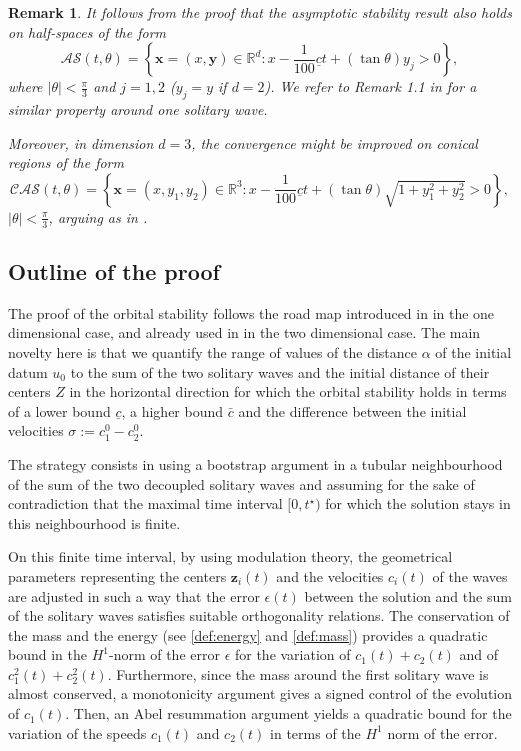 \documentclass[reqno,10pt]{amsart}
\newtheorem{rema}[lemm]{Remark}
\numberwithin{equation}{section}
\newcommand{\bx}{\mathbf{x}}
\newcommand{\by}{\mathbf{y}}
\newcommand{\bz}{\mathbf{z}}
\begin{document}
 \begin{rema}
It follows from the proof that the asymptotic stability result also holds on half-spaces of the form 
\begin{equation*}
\mathcal{AS}(t,\theta)=\left\{ \bx=(x,\by) \in \mathbb R^d : x-\frac1{100}\underline{c}t+(\tan{\theta})y_j>0 \right\},
\end{equation*}
where $|\theta|<\frac{\pi}3$ and $j=1,2$ ($y_j=y$ if $d=2$). We refer to Remark 1.1 in \cite{CMPS16} for a similar property around one solitary wave.

Moreover, in dimension $d=3$, the convergence might be improved on conical regions of the form 
\begin{equation*}
\mathcal{CAS}(t,\theta)=\left\{ \bx=(x,y_1,y_2) \in \mathbb R^3 : x-\frac1{100}\underline{c}t+(\tan{\theta})\sqrt{1+y_1^2+y_2^2}>0 \right\},
\end{equation*}
$|\theta|<\frac{\pi}3$, arguing as in \cite{FHRY23}.
 \end{rema}
	
	
	
		
\subsection{Outline of the proof}


The proof of the orbital stability follows the road map introduced in \cite{MMT02} in the one dimensional case, and already used in \cite{CMPS16} in the two dimensional case. The main novelty here is that we quantify the range of values of the distance $\alpha$ of the initial datum $u_0$ to the sum of the two solitary waves and the initial distance of their centers $Z$ in the horizontal direction for which the orbital stability holds in terms of a lower bound $\underline{c}$, a higher bound $\bar{c}$ and the difference between the initial velocities $\sigma:=c_1^0-c_2^0$.

The strategy consists in using a bootstrap argument in a tubular neighbourhood of the sum of the two decoupled solitary waves and assuming for the sake of contradiction that the maximal time interval $[0,t^{\star})$ for which the solution stays in this neighbourhood is finite. 

On this finite time interval, by using modulation theory, the geometrical parameters representing the centers $\bz_i(t)$ and the velocities $c_i(t)$ of the waves are adjusted in such a way that the error $\epsilon(t)$ between the solution and the sum of the solitary waves satisfies suitable orthogonality relations. The conservation of the mass and the energy (see \eqref{def:energy} and \eqref{def:mass}) provides a quadratic bound in the $H^1$-norm of the error $\epsilon$ for the variation of $c_1(t) + c_2(t)$ and of $c_1^2(t)+c_2^2(t)$. Furthermore, since the mass around the first solitary wave is almost conserved, a monotonicity argument gives a signed control of the evolution of $c_1(t)$. Then, an Abel resummation argument yields a quadratic bound for the variation of the speeds $c_1(t)$ and $c_2(t)$ in terms of the $H^1$ norm of the error.
\end{document}
